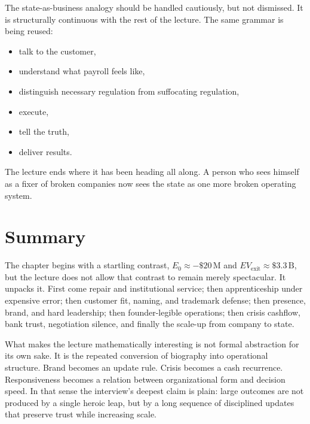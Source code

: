 The state-as-business analogy should be handled cautiously, but not dismissed. It is structurally continuous with the rest of the lecture. The same grammar is being reused:
\begin{itemize}
\item talk to the customer,
\item understand what payroll feels like,
\item distinguish necessary regulation from suffocating regulation,
\item execute,
\item tell the truth,
\item deliver results.
\end{itemize}
The lecture ends where it has been heading all along. A person who sees himself as a fixer of broken companies now sees the state as one more broken operating system.

\section{Summary}

The chapter begins with a startling contrast, \(E_0\approx -\$20\,\mathrm{M}\) and \(EV_{\mathrm{exit}}\approx \$3.3\,\mathrm{B}\), but the lecture does not allow that contrast to remain merely spectacular. It unpacks it. First come repair and institutional service; then apprenticeship under expensive error; then customer fit, naming, and trademark defense; then presence, brand, and hard leadership; then founder-legible operations; then crisis cashflow, bank trust, negotiation silence, and finally the scale-up from company to state.

What makes the lecture mathematically interesting is not formal abstraction for its own sake. It is the repeated conversion of biography into operational structure. Brand becomes an update rule. Crisis becomes a cash recurrence. Responsiveness becomes a relation between organizational form and decision speed. In that sense the interview's deepest claim is plain: large outcomes are not produced by a single heroic leap, but by a long sequence of disciplined updates that preserve trust while increasing scale.